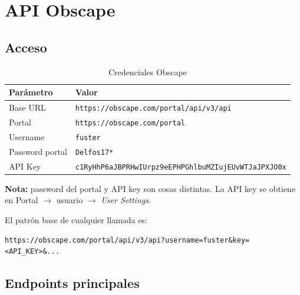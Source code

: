 \chapter{API Obscape}
\label{chap:api}

\section{Acceso}

\begin{table}[h!]
\centering
\begin{tabular}{ll}
\toprule
\textbf{Parámetro} & \textbf{Valor} \\
\midrule
Base URL         & \texttt{https://obscape.com/portal/api/v3/api} \\
Portal           & \texttt{https://obscape.com/portal} \\
Username         & \texttt{fuster} \\
Password portal  & \texttt{Delfos17*} \\
API Key          & \texttt{c1RyHhP6aJBPRHwIUrpz9eEPHPGhlbuMZIujEUvWTJaJPXJO0x} \\
\bottomrule
\end{tabular}
\caption{Credenciales Obscape}
\end{table}

\textbf{Nota:} password del portal y API key son cosas distintas. La API key
se obtiene en Portal $\to$ usuario $\to$ \emph{User Settings}.

El patrón base de cualquier llamada es:
\begin{Verbatim}
https://obscape.com/portal/api/v3/api?username=fuster&key=<API_KEY>&...
\end{Verbatim}

\section{Endpoints principales}

